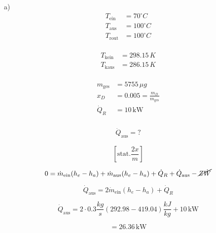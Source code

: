 a) 
\begin{align*}
T_{\text{ein}} &= 70^\circ C \\
T_{\text{aus}} &= 100^\circ C \\
T_{\text{rout}} &= 100^\circ C \\
\end{align*}

\begin{align*}
T_{\text{kein}} &= 298.15\,K \\
T_{\text{kaus}} &= 286.15\,K \\
\end{align*}

\begin{align*}
m_{\text{ges}} &= 5755\,\mu g \\
x_D &= 0.005 = \frac{m_D}{m_{\text{ges}}} \\
\dot{Q}_R &= 10\,\text{kW} \\
\end{align*}

\begin{align*}
\dot{Q}_{\text{aus}} = ?
\end{align*}

\[
\left[ \text{stat.} \frac{2x}{m} \right]
\]

\[
0 = \dot{m}_{\text{ein}} (h_e - h_a) + \dot{m}_{\text{aus}} (h_e - h_a) + \dot{Q}_R + \dot{Q}_{\text{aus}} - \cancel{Z\dot{W}}
\]

\[
\dot{Q}_{\text{aus}} = 2\dot{m}_{\text{ein}} (h_e - h_a) + \dot{Q}_R
\]

\[
\dot{Q}_{\text{aus}} = 2 \cdot 0.3 \frac{kg}{s} (292.98 - 419.04) \frac{kJ}{kg} + 10\,\text{kW}
\]

\[
= 26.36\,\text{kW}
\]